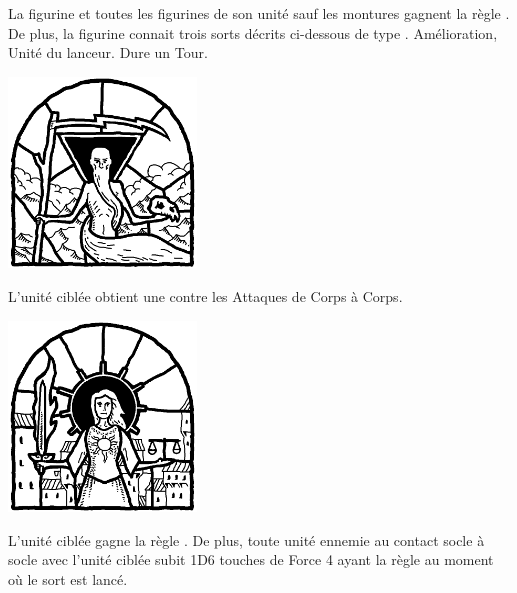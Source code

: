 

\startarmyspecialrules

\armyspecialruleentry{\blessings}

La figurine et toutes les figurines de son unité sauf les montures gagnent la règle \hatred{}. De plus, la figurine connait trois sorts décrits ci-dessous de type . Amélioration, Unité du lanceur. Dure un Tour.
\begin{multicols}{3}
\raggedcolumns
\begin{center}
	\includegraphics[width=5cm]{pics/ullorsblessing.png}
	
	\vspace*{5pt}{\Largerfontsize\antiquefont\ullorsblessing{}}
	
	\vspace*{5pt}L'unité ciblée obtient une  contre les Attaques de Corps à Corps.
\end{center}

\vspace*{\fill}
\columnbreak

\begin{center}
	\includegraphics[width=5cm]{pics/sunnasblessing.png}
	
	\vspace*{5pt}{\Largerfontsize\antiquefont\sunnasblessing{}}
	
	\vspace*{5pt}L'unité ciblée gagne la règle \flamingattacks{}. De plus, toute unité ennemie au contact socle à socle avec l'unité ciblée subit 1D6 touches de Force 4 ayant la règle \flamingattacks{} au moment où le sort est lancé.
\end{center}


\end{multicols}
